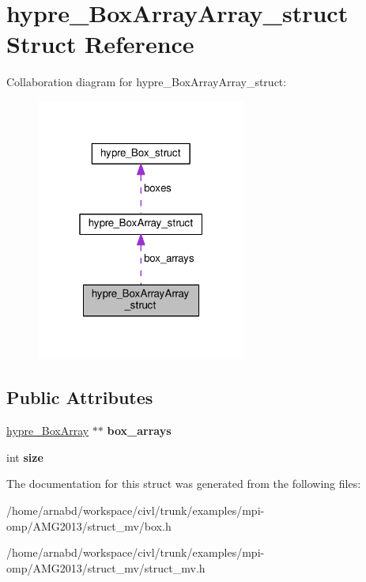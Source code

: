 \hypertarget{structhypre__BoxArrayArray__struct}{}\section{hypre\+\_\+\+Box\+Array\+Array\+\_\+struct Struct Reference}
\label{structhypre__BoxArrayArray__struct}


Collaboration diagram for hypre\+\_\+\+Box\+Array\+Array\+\_\+struct\+:
\nopagebreak
\begin{figure}[H]
\begin{center}
\leavevmode
\includegraphics[width=196pt]{structhypre__BoxArrayArray__struct__coll__graph}
\end{center}
\end{figure}
\subsection*{Public Attributes}
\begin{DoxyCompactItemize}
\item 
\hypertarget{structhypre__BoxArrayArray__struct_a06052a00c2f3a281353b26c9f3b78b58}{}\hyperlink{structhypre__BoxArray__struct}{hypre\+\_\+\+Box\+Array} $\ast$$\ast$ {\bfseries box\+\_\+arrays}\label{structhypre__BoxArrayArray__struct_a06052a00c2f3a281353b26c9f3b78b58}

\item 
\hypertarget{structhypre__BoxArrayArray__struct_a0492785a8b9c97d33e0ac392fa400dd1}{}int {\bfseries size}\label{structhypre__BoxArrayArray__struct_a0492785a8b9c97d33e0ac392fa400dd1}

\end{DoxyCompactItemize}


The documentation for this struct was generated from the following files\+:\begin{DoxyCompactItemize}
\item 
/home/arnabd/workspace/civl/trunk/examples/mpi-\/omp/\+A\+M\+G2013/struct\+\_\+mv/box.\+h\item 
/home/arnabd/workspace/civl/trunk/examples/mpi-\/omp/\+A\+M\+G2013/struct\+\_\+mv/struct\+\_\+mv.\+h\end{DoxyCompactItemize}
